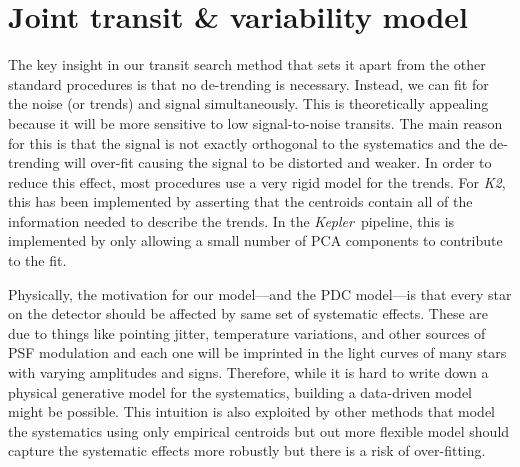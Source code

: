 \documentclass[12pt,preprint]{aastex}
\newcommand{\project}[1]{\emph{#1}}
\newcommand{\kepler}{\project{Kepler}}
\newcommand{\KT}{\project{K2}}
\begin{document}
\section{Joint transit \& variability model}

The key insight in our transit search method that sets it apart from the
other standard procedures is that no de-trending is necessary.
Instead, we can fit for the noise (or trends) and signal simultaneously.
This is theoretically appealing because it will be more sensitive to low
signal-to-noise transits.
The main reason for this is that the signal is not exactly orthogonal to the
systematics and the de-trending will over-fit causing the signal to be
distorted and weaker.
In order to reduce this effect, most procedures use a very rigid model for
the trends.
For \KT, this has been implemented by asserting that the centroids contain
all of the information needed to describe the trends.
In the \kepler\ pipeline, this is implemented by only allowing a small number
of PCA components to contribute to the fit.

Physically, the motivation for our model---and the PDC model---is that every
star on the detector should be affected by same set of systematic effects.
These are due to things like pointing jitter, temperature variations, and
other sources of PSF modulation and each one will be imprinted in the light
curves of many stars with varying amplitudes and signs.
Therefore, while it is hard to write down a physical generative model for the
systematics, building a data-driven model might be possible.
This intuition is also exploited by other methods that model the systematics
using only empirical centroids \citep{vanderberg-a, crossfield} but out more
flexible model should capture the systematic effects more robustly but there
is a risk of over-fitting.
\end{document}
